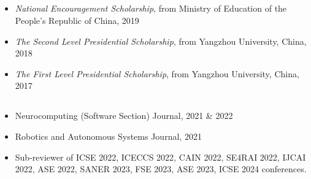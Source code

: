 \documentclass{resume}
\begin{document}
\vspace{-0.2cm}
\subsection*{\textcolor{accentcolor}{}}
  \begin{itemize}
    \item \emph{National Encouragement Scholarship}, from Ministry of Education of the People's Republic of China, 2019
    \item \emph{The Second Level Presidential Scholarship}, from Yangzhou University, China, 2018
    \item \emph{The First Level Presidential Scholarship}, from Yangzhou University, China, 2017
  \end{itemize}


\vspace{-0.2cm}
\subsection*{\textcolor{accentcolor}{}}
\begin{itemize}
  \item Neurocomputing (Software Section) Journal, 2021 \& 2022
  \item Robotics and Autonomous Systems Journal, 2021
  \item Sub-reviewer of ICSE 2022, ICECCS 2022, CAIN 2022, SE4RAI 2022, IJCAI 2022, ASE 2022, SANER 2023, FSE 2023, ASE 2023, ICSE 2024 conferences.
\end{itemize}
\end{document}
